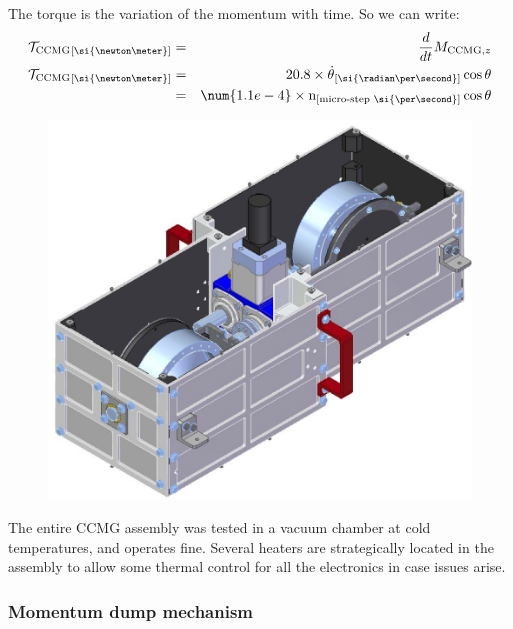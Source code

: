 The torque is the variation of the momentum with time. So we can write:
\begin{eqnarray}
\ccmgtorque\units{\si{\newton\meter}} &= &\frac{d}{dt}\MCCMGz\\
\ccmgtorque\units{\si{\newton\meter}} &= & 20.8\times \dot{\theta}\units{\si{\radian\per\second}} \cos\theta\\
 &= & \num{1.1e-4}\times \velstepper\units{micro-step~\si{\per\second}}\cos\theta
\end{eqnarray}

\begin{figure}[!ht]
	\centering
	
	\caption{}
	\label{fig:CCMGnocase}
    \end{figure}

\begin{figure}[!ht]
	\centering
	\includegraphics[width=\textwidth]{Figures/CCMG-case.png}
	\caption{}
	\label{fig:CCMGcase}
    \end{figure}


The entire CCMG assembly was tested in a vacuum chamber at cold temperatures, and operates fine. Several heaters are strategically located in the assembly to allow some thermal control for all the electronics in case issues arise.

\subsubsection{Momentum dump mechanism}
\label{subsec:chap3momdumpmotor}

